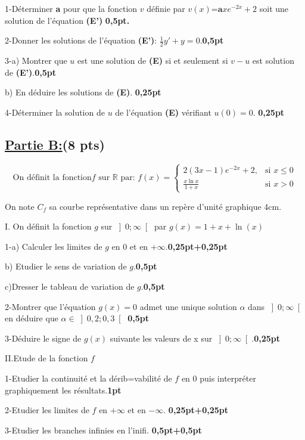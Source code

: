 \documentclass[12pt]{article}
\begin{document}
1-Déterminer \textbf{a} pour que la fonction $v$ définie par $v(x)$=$\textbf{a}xe^{-2x}+2$ soit une solution de l'équation \textbf{(E')} \textbf{0,5pt.}

2-Donner les solutions de l'équation \textbf{(E')}: $\frac{1}{2}y'+y=0$.\textbf{0,5pt}

3-a) Montrer que $u$ est une solution de \textbf{(E)} si et seulement si $v-u$ est solution de \textbf{(E')}.\textbf{0,5pt}

	b) En déduire les solutions de \textbf{(E)}. \textbf{0,25pt}
	
4-Déterminer la solution de $u$ de l'équation \textbf{(E)} vérifiant $u(0)=0$. \textbf{0,25pt}
\subsection*{\underline{Partie B:}(8	pts)}
\[\text{On définit la fonction} f \text{ sur } \mathbb{R} \text{ par: } f(x) = \begin{cases} 
  2(3x-1)e^{-2x}+2, & \text{si } x \leq 0 \\
  \frac{x\ln x}{1+x} & \text{si } x > 0 
\end{cases} \]

On note $C_{f}$ sa courbe représentative dans un repère d'unité graphique 4cm.

I. On définit la fonction $g$ sur $\left]0 ; \infty\right[ $ par $g(x)=1+x+\ln(x)$

1-a) Calculer les limites de $g$ en 0 et en $+\infty$.\textbf{0,25pt+0,25pt}

b) Etudier le sens de variation de $g$.\textbf{0,5pt}

c)Dresser le tableau de variation de $g$.\textbf{0,5pt}

2-Montrer que l'équation $g(x)=0$ admet une unique solution $\alpha$ dans $\left]0 ; \infty\right[$ en déduire que   $\alpha \in \left]0,2 ; 0,3\right[$ \textbf{0,5pt}

3-Déduire le signe de $g(x)$ suivante les valeurs de x sur $\left]0 ; \infty\right[$.\textbf{0,25pt}

II.Etude de la fonction $f$

1-Etudier la continuité et la dérib=vabilité de $f$ en 0 puis interpréter graphiquement les résultats.\textbf{1pt}

2-Etudier les limites de $f$ en $+\infty$ et en $-\infty$. \textbf{0,25pt+0,25pt}

3-Etudier les branches infinies en l'inifi. \textbf{0,5pt+0,5pt}
\end{document}
